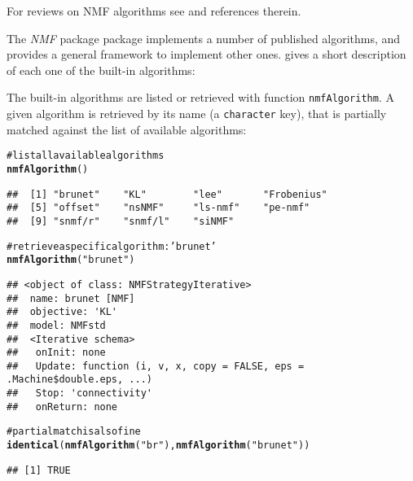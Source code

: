 \documentclass[a4paper]{article}\usepackage{graphicx, color}
\makeatletter
\newcommand{\hlfunctioncall}[1]{\textcolor[rgb]{0.501960784313725,0,0.329411764705882}{\textbf{#1}}}%
\newcommand{\hlstring}[1]{\textcolor[rgb]{0.6,0.6,1}{#1}}%
\newcommand{\hlcomment}[1]{\textcolor[rgb]{0.180392156862745,0.6,0.341176470588235}{#1}}%
\newenvironment{kframe}{%
 \def\at@end@of@kframe{}%
 \ifinner\ifhmode%
  \def\at@end@of@kframe{\end{minipage}}%
  \begin{minipage}{\columnwidth}%
 \fi\fi%
 \def\FrameCommand##1{\hskip\@totalleftmargin \hskip-\fboxsep
 \colorbox{shadecolor}{##1}\hskip-\fboxsep
     \hskip-\linewidth \hskip-\@totalleftmargin \hskip\columnwidth}%
 \MakeFramed {\advance\hsize-\width
   \@totalleftmargin\z@ \linewidth\hsize
   \@setminipage}}%
 {\par\unskip\endMakeFramed%
 \at@end@of@kframe}
\newenvironment{knitrout}{}{} %
\let\code=\texttt
\newcommand{\pkgname}[1]{\textit{#1}\xspace}
\newcommand{\Rpkg}[1]{\pkgname{#1} package\xspace}
\newcommand{\nmfpack}{\Rpkg{NMF}}
\renewcommand{\cite}[1]{\parencite{#1}}
\makeatother
\begin{document}
For reviews on NMF algorithms see \cite{Berry2007, Chu2004} and references therein.

The \nmfpack package implements a number of published algorithms, and provides a general framework to implement other ones.
 gives a short description of each one of the built-in algorithms:

The built-in algorithms are listed or retrieved with function \code{nmfAlgorithm}. 
A given algorithm is retrieved by its name (a \code{character} key), that is partially matched against the list of available algorithms:

\begin{knitrout}
\color{fgcolor}\begin{kframe}
\begin{alltt}
\hlcomment{# list all available algorithms}
\hlfunctioncall{nmfAlgorithm}()
\end{alltt}
\begin{verbatim}
##  [1] "brunet"    "KL"        "lee"       "Frobenius"
##  [5] "offset"    "nsNMF"     "ls-nmf"    "pe-nmf"   
##  [9] "snmf/r"    "snmf/l"    "siNMF"
\end{verbatim}
\begin{alltt}
\hlcomment{# retrieve a specific algorithm: 'brunet'}
\hlfunctioncall{nmfAlgorithm}(\hlstring{"brunet"})
\end{alltt}
\begin{verbatim}
## <object of class: NMFStrategyIterative>
##  name: brunet [NMF]
##  objective: 'KL' 
##  model: NMFstd 
##  <Iterative schema>
##   onInit: none
##   Update: function (i, v, x, copy = FALSE, eps = .Machine$double.eps, ...)
##   Stop: 'connectivity'
##   onReturn: none
\end{verbatim}
\begin{alltt}
\hlcomment{# partial match is also fine}
\hlfunctioncall{identical}(\hlfunctioncall{nmfAlgorithm}(\hlstring{"br"}), \hlfunctioncall{nmfAlgorithm}(\hlstring{"brunet"}))
\end{alltt}
\begin{verbatim}
## [1] TRUE
\end{verbatim}
\end{kframe}
\end{knitrout}
\end{document}
